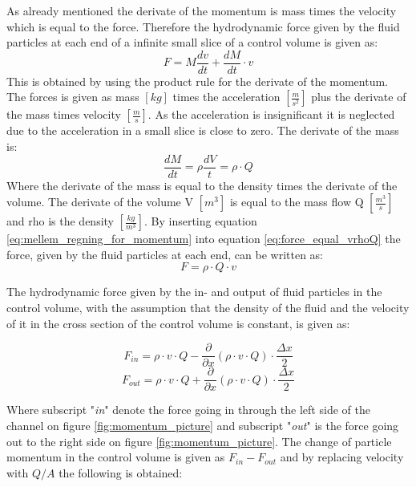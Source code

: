 As already mentioned the derivate of the momentum is mass times the velocity which is equal to the force. Therefore the hydrodynamic force given by the fluid particles at each end of a infinite small slice of a control volume is given as:
\begin{equation}\label{eq:force_equal_vrhoQ}
	F= M \frac{dv}{dt} + \frac{dM}{dt} \cdot v 
\end{equation}
This is obtained by using the product rule for the derivate of the momentum. The forces is given as mass $[kg]$ times the acceleration $\left[\frac{m}{s^2}\right]$ plus the derivate of the mass times velocity $\left[\frac{m}{s}\right]$. As the acceleration is insignificant it is neglected due to the acceleration in a small slice is close to zero. The derivate of the mass is:
\begin{equation}\label{eq:mellem_regning_for_momentum}
	\frac{dM}{dt} = \rho \frac{dV}{t} = \rho\cdot Q
\end{equation}
Where the derivate of the mass is equal to the density times the derivate of the volume. The derivate of the volume V $\left[m^3\right]$ is equal to the mass flow Q $\left[\frac{m^3}{s}\right]$ and rho is the density $\left[\frac{kg}{m^3}\right]$. By inserting equation \ref{eq:mellem_regning_for_momentum} into equation \ref{eq:force_equal_vrhoQ} the force, given by the fluid particles at each end, can be written as:
\begin{equation}
	F = \rho\cdot Q\cdot v 
\end{equation}

The hydrodynamic force given by the in- and output of fluid particles in the control volume, with the assumption that the density of the fluid and the velocity of it in the cross section of the control volume is constant, is given as:

\begin{equation}
	F_{in}= \rho \cdot v \cdot Q - \frac{\partial}{\partial x}(\rho \cdot v \cdot Q) \cdot \frac{\Delta x}{2}
\end{equation}
\begin{equation}
	F_{out} = \rho \cdot v \cdot Q + \frac{\partial}{\partial x}(\rho \cdot v \cdot Q) \cdot \frac{\Delta x}{2}
\end{equation}

Where subscript "\textit{in}" denote the force going in through the left side of the channel on figure \ref{fig:momentum_picture} and subscript "\textit{out}" is the force going out to the right side on figure \ref{fig:momentum_picture}.
The change of particle momentum in the control volume is given as $F_{in}- F_{out}$ and by replacing velocity with $Q/A$ the following is obtained:

